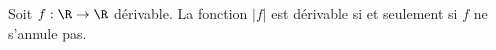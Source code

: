 Soit $f:\R\to\R$ dérivable. La fonction $|f|$ est dérivable si et seulement si $f$ ne s'annule pas.

\begin{reponses}
\end{reponses}

